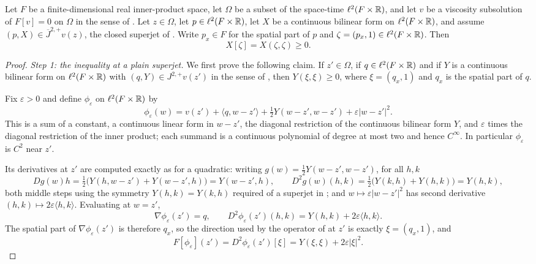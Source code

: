 \begin{lemma}
Let $F$ be a finite-dimensional real inner-product space, let $\Omega$ be a
subset of the space-time $\ell^2(F\times\mathbb{R})$, and let $v$ be a viscosity
subsolution of $F[v]=0$ on $\Omega$ in the sense of . Let
$z\in\Omega$, let $p\in\ell^2(F\times\mathbb{R})$, let $X$ be a continuous bilinear form
on $\ell^2(F\times\mathbb{R})$, and assume $(p,X)\in\overline J^{2,+}v(z)$, the closed
superjet of . Write $p_x\in F$ for the spatial part of
$p$ and $\zeta=(p_x,1)\in\ell^2(F\times\mathbb{R})$. Then
\[
  X[\zeta]=X(\zeta,\zeta)\ge0 .
\]
\end{lemma}
\begin{proof}
\emph{Step 1: the inequality at a plain superjet.}
We first prove the following claim. If $z'\in\Omega$, if
$q\in\ell^2(F\times\mathbb{R})$ and if $Y$ is a continuous bilinear form on
$\ell^2(F\times\mathbb{R})$ with $(q,Y)\in J^{2,+}v(z')$ in the sense of
, then $Y(\xi,\xi)\ge0$, where $\xi=(q_x,1)$ and $q_x$ is the
spatial part of $q$.

Fix $\varepsilon>0$ and define $\phi_\varepsilon$ on $\ell^2(F\times\mathbb{R})$ by
\[
  \phi_\varepsilon(w)=v(z')+\langle q,w-z'\rangle
     +\tfrac12Y(w-z',w-z')+\varepsilon|w-z'|^2 .
\]
This is a sum of a constant, a continuous linear form in $w-z'$, the diagonal
restriction of the continuous bilinear form $Y$, and $\varepsilon$ times the
diagonal restriction of the inner product; each summand is a continuous
polynomial of degree at most two and hence $C^\infty$. In particular
$\phi_\varepsilon$ is $C^2$ near $z'$.

Its derivatives at $z'$ are computed exactly as for a quadratic: writing
$g(w)=\tfrac12Y(w-z',w-z')$, for all $h,k$
\[
  Dg(w)h=\tfrac12\bigl(Y(h,w-z')+Y(w-z',h)\bigr)=Y(w-z',h),
  \qquad
  D^2g(w)(h,k)=\tfrac12\bigl(Y(k,h)+Y(h,k)\bigr)=Y(h,k),
\]
both middle steps using the symmetry $Y(h,k)=Y(k,h)$ required of a superjet in
; and $w\mapsto\varepsilon|w-z'|^2$ has second derivative
$(h,k)\mapsto2\varepsilon\langle h,k\rangle$. Evaluating at $w=z'$,
\[
  \nabla\phi_\varepsilon(z')=q,
  \qquad
  D^2\phi_\varepsilon(z')(h,k)=Y(h,k)+2\varepsilon\langle h,k\rangle .
\]
The spatial part of $\nabla\phi_\varepsilon(z')$ is therefore $q_x$, so the
direction used by the operator of  at $z'$ is exactly
$\xi=(q_x,1)$, and
\begin{equation}\label{eq:lscs-limitop}
  F[\phi_\varepsilon](z')
    =D^2\phi_\varepsilon(z')[\xi]
    =Y(\xi,\xi)+2\varepsilon|\xi|^2 .
\end{equation}


\end{proof}
